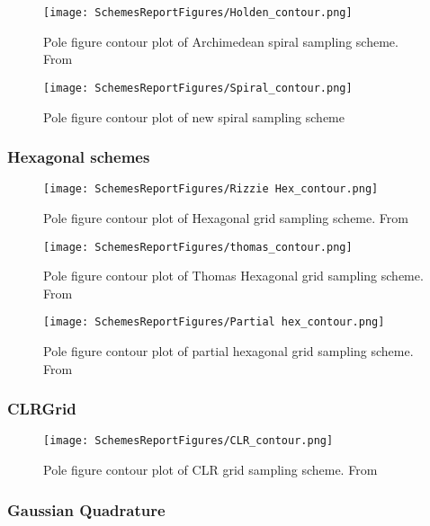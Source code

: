 \documentclass{article}
\begin{document}
\begin{figure}[H]
    \centering
    \texttt{[image: SchemesReportFigures/Holden\_contour.png]}
    \caption{Pole figure contour plot of Archimedean spiral sampling scheme. From \cite{Holden}}
\end{figure}

\begin{figure}[H]
    \centering
    \texttt{[image: SchemesReportFigures/Spiral\_contour.png]}
    \caption{Pole figure contour plot of new spiral sampling scheme}
\end{figure}


\subsubsection{Hexagonal schemes}
\begin{figure}[H]
    \centering
    \texttt{[image: SchemesReportFigures/Rizzie Hex\_contour.png]}
    \caption{Pole figure contour plot of Hexagonal grid sampling scheme. From \cite{Rizzie}}
\end{figure}


\begin{figure}[H]
    \centering
    \texttt{[image: SchemesReportFigures/thomas\_contour.png]}
    \caption{Pole figure contour plot of Thomas Hexagonal grid sampling scheme. From \cite{Matthies}}
\end{figure}


\begin{figure}[H]
    \centering
    \texttt{[image: SchemesReportFigures/Partial hex\_contour.png]}
    \caption{Pole figure contour plot of partial hexagonal grid sampling scheme. From \cite{Rizzie}}
\end{figure}


\subsubsection{CLRGrid}

\begin{figure}[H]
    \centering
    \texttt{[image: SchemesReportFigures/CLR\_contour.png]}
    \caption{Pole figure contour plot of CLR grid sampling scheme. From \cite{Bruker}}
\end{figure}


\subsubsection{Gaussian Quadrature}
\end{document}

